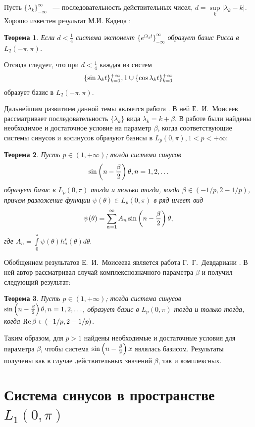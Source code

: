 ﻿\documentclass[oneside, final, 14pt]{extreport}
\newtheorem{theorem}{Теорема}
\begin{document}
Пусть $\{\lambda_k\}_{-\infty}^{\infty}$ ~--- последовательность действительных чисел, 
$d = \underset{k}{\sup}|\lambda_k - k| $.
Хорошо известен результат М.И. Кадеца \cite{kadec}:

\begin{theorem}
Если $ d < \frac{1}{4}$ система экспонент $\{e^{i\lambda_k t}\}_{-\infty}^{\infty}$ 
образует базис Рисса в $L_2(-\pi, \pi)$. 
\end{theorem}

Отсюда следует, что при $d < \frac{1}{4}$ каждая из систем 
$$
	\{\sin\lambda_kt\}_{k = 1}^{+\infty}, \thinspace\\
	1 \cup \{\cos\lambda_kt\}_{k = 1}^{+\infty}
$$
образует базис в $L_2(-\pi, \pi)$.

Дальнейшим развитием данной темы является работа \cite{moiseev-dan}.
В ней Е.~И.~Моисеев  рассматривает последовательность $\{\lambda_k\}$ вида $\lambda_k = k + \beta$.
В работе были найдены необходимое и достаточное условие на параметр $\beta$, 
когда соответствующие системы синусов и косинусов образуют базисы в $L_p(0, \pi), 1 < p < +\infty$: 

\begin{theorem}
	Пусть $p \in (1, +\infty)$; тогда система синусов $$\sin\left(n - \frac{\beta}{2}\right)\theta, n = 1, 2, \ldots$$ 
	образует базис в $L_p(0, \pi)$ тогда и только тогда, когда 
	$\beta \in (-1/p, 2 - 1/p)$, причем разложение функции $\psi(\theta) \in L_p(0, \pi)$
	в ряд имеет вид
	$$
		\psi(\theta) = \sum\limits_{n = 1}^{\infty}A_{n}\sin\left(n - \frac{\beta}{2}\right)\theta,
	$$
	где $A_n = \int\limits_0^{\pi}\psi(\theta)h_n^s(\theta)d\theta.$
\end{theorem}

Обобщением результатов Е.~И.~Моисеева является работа Г.~Г.~Девдариани \cite{devdariani}.
В ней автор рассматривал случай комплекснозначного параметра $\beta$ и получил следующий результат:
\begin{theorem}
	Пусть $p \in (1, +\infty)$; тогда система синусов $\sin\left(n - \frac{\beta}{2}\right)\theta, n = 1, 2, \ldots$, 
	образует базис в $L_p(0, \pi)$ тогда и только тогда, 
	когда $\operatorname{Re}{\beta} \in (-1/p, 2 - 1/p)$.
\end{theorem}

Таким образом, для $p > 1$ найдены необходимые и достаточные условия для параметра $\beta$,
чтобы система $\sin\left(n - \frac{\beta}{2}\right)x$ являлась базисом. Результаты получены как в случае действительных значений $\beta$, 
так и комплексных.

\section{Система синусов в пространстве $L_1(0, \pi)$}
\end{document}
